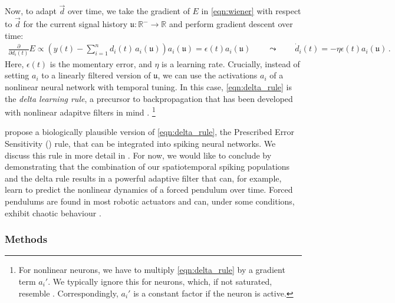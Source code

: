 Now, to adapt $\vec d$ over time, we take the gradient of $E$ in \cref{eqn:wiener} with respect to $\vec d$ for the current signal history $\mathfrak{u} : \mathbb{R}^- \longrightarrow \mathbb{R}$ and perform gradient descent over time:
\begin{align}
	\frac{\partial}{\partial d_i(t)} E \propto \left(y(t) - \sum\nolimits_{i = 1}^n d_i(t) \, a_i(\mathfrak{u}) \right) a_i(\mathfrak{u}) = \epsilon(t) a_i(\mathfrak{u}) \quad\quad \leadsto \quad\quad \dot{d}_i(t) = - \eta \epsilon(t) a_i(\mathfrak{u}) \,.
	\label{eqn:delta_rule}
\end{align}
Here, $\epsilon(t)$ is the momentary error, and $\eta$ is a learning rate.
Crucially, instead of setting $a_i$ to a linearly filtered version of $\mathfrak{u}$, we can use the activations $a_i$ of a nonlinear neural network with temporal tuning.
In this case, \cref{eqn:delta_rule} is the \emph{delta learning rule}, a precursor to back\-pro\-pa\-ga\-tion that has been developed with nonlinear adapitve filters in mind \citep{widrow1960adaptive}.%
\footnote{For nonlinear neurons, we have to multiply \cref{eqn:delta_rule} by a gradient term $a_i'$. We typically ignore this for \LIF neurons, which, if not saturated, resemble \ReLUpl. Correspondingly, $a_i'$ is a constant factor if the neuron is active.}

 propose a biologically plausible version of \cref{eqn:delta_rule}, the Prescribed Error Sensitivity (\PES) rule,  that can be integrated into spiking neural networks.
We discuss this rule in more detail in .
For now, we would like to conclude by demonstrating that the combination of our spatiotemporal spiking \NEF populations and the delta rule results in a powerful adaptive filter that can, for example, learn to predict the nonlinear dynamics of a forced pendulum over time.
Forced pendulums are found in most robotic actuators and can, under some conditions, exhibit chaotic behaviour \citep{hubbard1999forced}.

\subsubsection{Methods}

